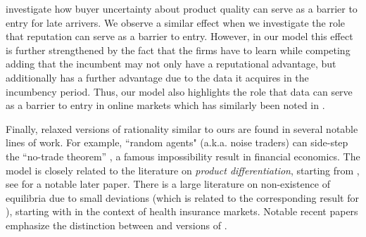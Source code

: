 \cite{schmalensee1982product, bagwell1990informational} investigate how buyer uncertainty about product quality can serve as a barrier to entry for late arrivers. We observe a similar effect when we investigate the role that reputation can serve as a barrier to entry. However, in our model this effect is further strengthened by the fact that the firms have to learn while competing adding that the incumbent may not only have a reputational advantage, but additionally has a further advantage due to the data it acquires in the incumbency period. Thus, our model also highlights the role that data can serve as a barrier to entry in online markets which has similarly been noted in \cite{de2020data}. 
 

Finally, relaxed versions of rationality similar to ours are found in several notable lines of work. For example, ``random agents" (a.k.a. noise traders) can side-step the ``no-trade theorem'' \citep{Milgrom-Stokey-82}, a famous impossibility result in financial economics. The \SoftMaxRandom model is closely related to the literature on \emph{product differentiation}, starting from \cite{Hotelling-29}, see \cite{Perloff-Salop-85} for a notable later paper. There is a large literature on non-existence of equilibria due to small deviations   (which is related to the corresponding result for \HardMaxRandom), starting with \cite{Rothschild-Stiglitz-76} in the context of health insurance markets. Notable recent papers \citep{Veiga-Weyl-16,Azevedo-Gottlieb-17} emphasize the distinction between \HardMax and versions of \SoftMaxRandom. 







